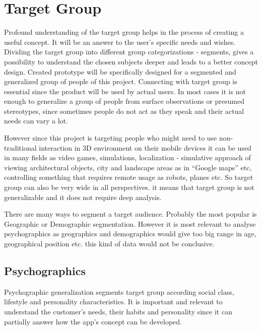 \section{Target Group}

Profound understanding of the target group helps in the process of creating a useful concept. It will be an answer to the user’s specific needs and wishes. Dividing the target group into different group categorizations - segments, gives a possibility to understand the chosen subjects deeper and leads to a better concept design. Created prototype will be specifically designed for a segmented and generalized group of people of this project. Connecting with target group is essential since the product will be used by actual users. In most cases it is not enough to generalize a group of people from surface observations or presumed stereotypes, since sometimes people do not act as they speak and their actual needs can vary a lot.

However since this project is targeting people who might need to use non-traditional interaction in 3D environment on their mobile devices it can be used in many fields as video games, simulations, localization - simulative approach of viewing architectural objects, city and landscape areas as in “Google maps” etc, controlling something that requires remote usage as robots, planes etc. So target group can also be very wide in all perspectives. it means that target group is not generalizable and it does not require deep analysis. 

There are many ways to segment a target audience. Probably the most popular is Geographic or Demographic segmentation. However it is most relevant to analyse psychographics as geographics and demographics would give too big range in age, geographical position etc. this kind of data would not be conclusive. 

\subsection{Psychographics}
Psychographic generalization segments target group according social class, lifestyle and personality characteristics. \cite{Psychographic} It is important and relevant to understand the customer's needs, their habits and personality since it can partially answer how the app's concept can be developed.

